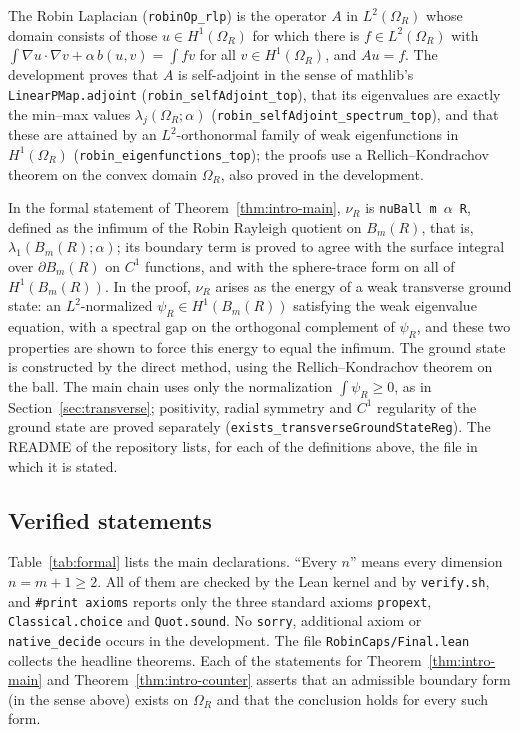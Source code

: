 \documentclass[11pt,a4paper]{article}
\numberwithin{equation}{section}
\theoremstyle{paperplain}
\theoremstyle{remark}
\newcommand{\lean}[1]{\texttt{#1}}
\begin{document}
The Robin Laplacian (\lean{robinOp\_rlp}) is the operator $A$ in
$L^2(\Omega_R)$ whose domain consists of those $u\in H^1(\Omega_R)$ for
which there is $f\in L^2(\Omega_R)$ with
$\int\nabla u\cdot\nabla v+\alpha\,b(u,v)=\int fv$ for all
$v\in H^1(\Omega_R)$, and $Au=f$. The development proves that $A$ is
self-adjoint in the sense of mathlib's \lean{LinearPMap.adjoint}
(\lean{robin\_selfAdjoint\_top}), that its eigenvalues are exactly the
min--max values $\lambda_j(\Omega_R;\alpha)$
(\lean{robin\_selfAdjoint\_spectrum\_top}), and that these are attained by
an $L^2$-orthonormal family of weak eigenfunctions in $H^1(\Omega_R)$
(\lean{robin\_eigenfunctions\_top}); the proofs use a Rellich--Kondrachov
theorem on the convex domain $\Omega_R$, also proved in the development.

In the formal statement of Theorem~\ref{thm:intro-main}, $\nu_R$ is
\lean{nuBall m $\alpha$ R}, defined as the infimum of the Robin
Rayleigh quotient on $B_m(R)$, that is, $\lambda_1(B_m(R);\alpha)$; its
boundary term is proved to agree with the surface integral over
$\partial B_m(R)$ on $C^1$ functions, and with the sphere-trace form on all
of $H^1(B_m(R))$. In the proof,
$\nu_R$ arises as the energy of a weak transverse ground state: an
$L^2$-normalized $\psi_R\in H^1(B_m(R))$ satisfying the weak eigenvalue
equation, with a spectral gap on the orthogonal complement of $\psi_R$, and
these two properties are shown to force this energy to equal the infimum.
The ground state is constructed by the direct method, using the
Rellich--Kondrachov theorem on the ball. The main chain uses only the
normalization $\int\psi_R\ge0$, as in Section~\ref{sec:transverse};
positivity, radial symmetry and $C^1$ regularity of the ground state are
proved separately (\lean{exists\_transverseGroundStateReg}).
The README of the repository lists, for each of the definitions above, the
file in which it is stated.

\subsection{Verified statements}
Table~\ref{tab:formal} lists the main declarations. ``Every $n$'' means every
dimension $n=m+1\ge2$. All of them are checked by the Lean kernel and by \lean{verify.sh}, and
\lean{\#print axioms} reports only the three standard axioms
\lean{propext}, \lean{Classical.choice} and \lean{Quot.sound}. No
\lean{sorry}, additional axiom or \lean{native\_decide} occurs in the
development. The file \lean{RobinCaps/Final.lean} collects the headline theorems. Each
of the statements for Theorem~\ref{thm:intro-main} and
Theorem~\ref{thm:intro-counter} asserts that an admissible boundary form
(in the sense above) exists on $\Omega_R$ and that the conclusion holds for
every such form.
\end{document}
